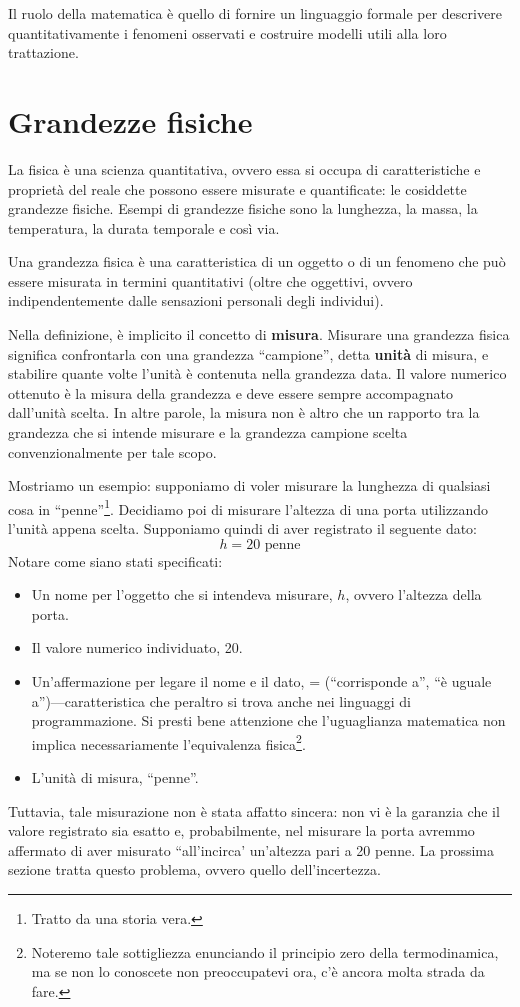 Il ruolo della matematica è quello di fornire un linguaggio formale per descrivere
quantitativamente i fenomeni osservati e costruire modelli utili alla loro
trattazione.



\section{Grandezze fisiche}
La fisica è una scienza quantitativa, ovvero essa si occupa di caratteristiche
e proprietà del reale che possono essere misurate e quantificate: le cosiddette
grandezze fisiche. Esempi di grandezze fisiche sono la lunghezza, la massa, la
temperatura, la durata temporale e così via.

\begin{tcolorbox}[colback = yellow!30, colframe = yellow!30!black, title = {Grandezza fisica}]
Una grandezza fisica è una caratteristica di un oggetto o di un fenomeno che può
essere misurata in termini quantitativi (oltre che oggettivi, ovvero indipendentemente
dalle sensazioni personali degli individui).
\end{tcolorbox}

\noindent Nella definizione, è implicito il concetto di \textbf{misura}. Misurare una grandezza
fisica significa confrontarla con una grandezza ``campione'', detta \textbf{unità}
di misura, e stabilire quante volte l'unità è contenuta nella
grandezza data. Il valore numerico ottenuto è la misura della grandezza e deve
essere sempre accompagnato dall'unità scelta.
In altre parole, la misura non è altro che un rapporto tra la
grandezza che si intende misurare e la grandezza campione scelta convenzionalmente
per tale scopo.

Mostriamo un esempio: supponiamo di voler misurare la lunghezza di qualsiasi cosa
in ``penne''\footnote{Tratto da una storia vera.}. Decidiamo poi di misurare l'altezza
di una porta utilizzando l'unità appena scelta. Supponiamo quindi di aver registrato il
seguente dato:
\[ h = 20 \text{ penne} \]
Notare come siano stati specificati:
\begin{itemize}
    \item Un nome per l'oggetto che si intendeva misurare, $h$, ovvero l'altezza
    della porta.
    \item Il valore numerico individuato, 20.
    \item Un'affermazione per legare il nome e il dato, = (``corrisponde a'', ``è
    uguale a'')—caratteristica che peraltro si trova anche nei linguaggi di
    programmazione. Si presti bene attenzione che l'uguaglianza matematica
    non implica necessariamente l'equivalenza fisica\footnote{Noteremo tale
    sottigliezza enunciando il principio zero della termodinamica, ma se non
    lo conoscete non preoccupatevi ora, c'è ancora molta strada da fare.}.
    \item L'unità di misura, ``penne''.
\end{itemize}
Tuttavia, tale misurazione non è stata affatto sincera: non vi è la
garanzia che il valore registrato sia esatto e, probabilmente, nel
misurare la porta avremmo affermato di aver misurato ``all'incirca'
un'altezza pari a 20 penne. La prossima sezione
tratta questo problema, ovvero quello dell'incertezza.

